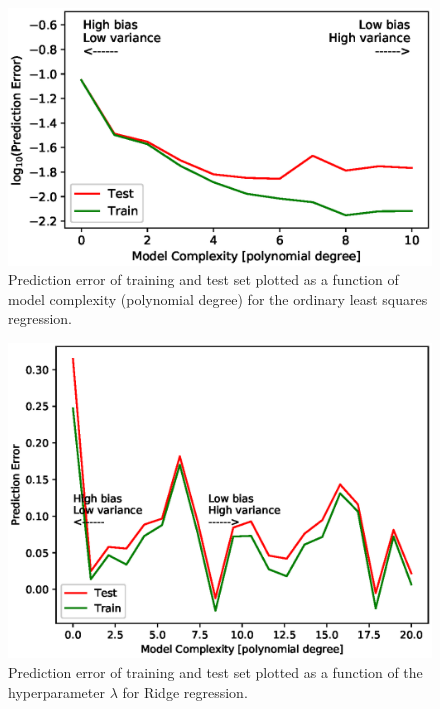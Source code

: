 \documentclass[a4paper, 11pt]{article}
\begin{document}
\begin{figure}[t!]
    \includegraphics{doc/figs/biasvariancetradeoff.eps}
    \caption{Prediction error of training and test set plotted as a function of model complexity (polynomial degree) for the ordinary least squares regression.}
    \label{fig:my_label}
\end{figure}
    
\begin{figure}[h]
    \includegraphics{doc/figs/biasvariancetradeoff_Ridge.eps}
    \caption{Prediction error of training and test set plotted as a function of the hyperparameter $\lambda$ for Ridge regression.}
\end{figure}    
\end{document}
